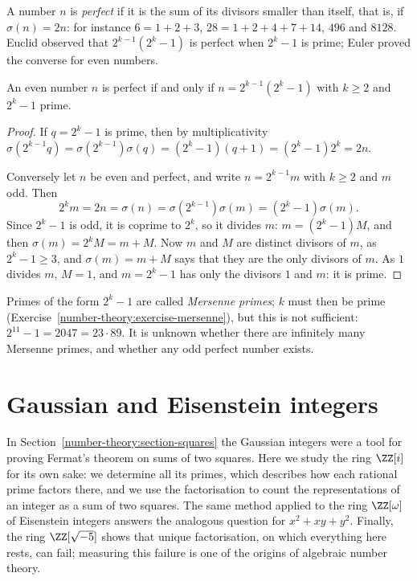 A number $n$ is \emph{perfect} if it is the sum of its divisors smaller than itself, that is, if $\sigma(n) = 2n$: for instance $6 = 1 + 2 + 3$, $28 = 1 + 2 + 4 + 7 + 14$, $496$ and $8128$. Euclid observed
that $2^{k-1}(2^k - 1)$ is perfect when $2^k - 1$ is prime; Euler proved the converse for even numbers.

\begin{theorem}\label{number-theory:theorem-perfect}
An even number $n$ is perfect if and only if $n = 2^{k-1}(2^k - 1)$ with $k \geq 2$ and $2^k - 1$ prime.
\end{theorem}

\begin{proof}
If $q = 2^k - 1$ is prime, then by multiplicativity $\sigma(2^{k-1}q) = \sigma(2^{k-1})\sigma(q) = (2^k - 1)(q + 1) = (2^k - 1)2^k = 2n$.

Conversely let $n$ be even and perfect, and write $n = 2^{k-1}m$ with $k \geq 2$ and $m$ odd. Then
\[
2^km = 2n = \sigma(n) = \sigma(2^{k-1})\sigma(m) = (2^k - 1)\sigma(m).
\]
Since $2^k - 1$ is odd, it is coprime to $2^k$, so it divides $m$: $m = (2^k - 1)M$, and then $\sigma(m) = 2^kM = m + M$. Now $m$ and $M$ are distinct divisors of $m$, as $2^k - 1 \geq 3$, and
$\sigma(m) = m + M$ says that they are the only divisors of $m$. As $1$ divides $m$, $M = 1$, and $m = 2^k - 1$ has only the divisors $1$ and $m$: it is prime.
\end{proof}

\begin{remark}\label{number-theory:remark-perfect}
Primes of the form $2^k - 1$ are called \emph{Mersenne primes}; $k$ must then be prime (Exercise~\ref{number-theory:exercise-mersenne}), but this is not sufficient: $2^{11} - 1 = 2047 = 23 \cdot 89$. It is
unknown whether there are infinitely many Mersenne primes, and whether any odd perfect number exists.
\end{remark}

\section{Gaussian and Eisenstein integers}\label{number-theory:section-gaussian}

In Section~\ref{number-theory:section-squares} the Gaussian integers were a tool for proving Fermat's theorem on sums of two squares. Here we study the ring $\ZZ[i]$ for its own sake: we determine
all its primes, which describes how each rational prime factors there, and we use the factorisation to count the representations of an integer as a sum of two squares. The same method applied to the
ring $\ZZ[\omega]$ of Eisenstein integers answers the analogous question for $x^2 + xy + y^2$. Finally, the ring $\ZZ[\sqrt{-5}]$ shows that unique factorisation, on which everything here rests, can fail;
measuring this failure is one of the origins of algebraic number theory.

